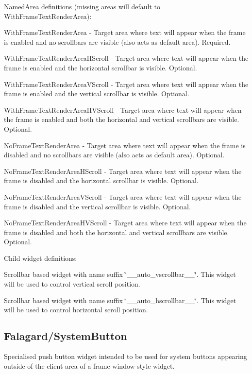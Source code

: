\begin{DoxyItemize}
\item Named\+Area definitions (missing areas will default to With\+Frame\+Text\+Render\+Area)\+: 
\begin{DoxyItemize}
\item With\+Frame\+Text\+Render\+Area -\/ Target area where text will appear when the frame is enabled and no scrollbars are visible (also acts as default area). Required. 
\item With\+Frame\+Text\+Render\+Area\+H\+Scroll -\/ Target area where text will appear when the frame is enabled and the horizontal scrollbar is visible. Optional. 
\item With\+Frame\+Text\+Render\+Area\+V\+Scroll -\/ Target area where text will appear when the frame is enabled and the vertical scrollbar is visible. Optional. 
\item With\+Frame\+Text\+Render\+Area\+H\+V\+Scroll -\/ Target area where text will appear when the frame is enabled and both the horizontal and vertical scrollbars are visible. Optional. 
\item No\+Frame\+Text\+Render\+Area -\/ Target area where text will appear when the frame is disabled and no scrollbars are visible (also acts as default area). Optional. 
\item No\+Frame\+Text\+Render\+Area\+H\+Scroll -\/ Target area where text will appear when the frame is disabled and the horizontal scrollbar is visible. Optional. 
\item No\+Frame\+Text\+Render\+Area\+V\+Scroll -\/ Target area where text will appear when the frame is disabled and the vertical scrollbar is visible. Optional. 
\item No\+Frame\+Text\+Render\+Area\+H\+V\+Scroll -\/ Target area where text will appear when the frame is disabled and both the horizontal and vertical scrollbars are visible. Optional. 
\end{DoxyItemize}


\item Child widget definitions\+: 
\begin{DoxyItemize}
\item Scrollbar based widget with name suffix \char`\"{}\+\_\+\+\_\+auto\+\_\+vscrollbar\+\_\+\+\_\+\char`\"{}. This widget will be used to control vertical scroll position. 
\item Scrollbar based widget with name suffix \char`\"{}\+\_\+\+\_\+auto\+\_\+hscrollbar\+\_\+\+\_\+\char`\"{}. This widget will be used to control horizontal scroll position. 
\end{DoxyItemize}
\end{DoxyItemize}\hypertarget{fal_wr_ref_fal_wr_ref_sec_23}{}\subsection{Falagard/\+System\+Button}\label{fal_wr_ref_fal_wr_ref_sec_23}
Specialised push button widget intended to be used for \textquotesingle{}system\textquotesingle{} buttons appearing outside of the client area of a frame window style widget.

